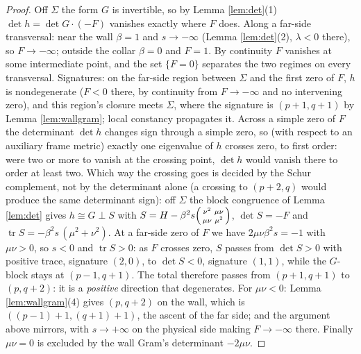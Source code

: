 \documentclass[11pt]{article}
\theoremstyle{definition}
\newcommand{\Sig}{\Sigma}
\begin{document}
\begin{proof}
Off $\Sig$ the form $G$ is invertible, so by Lemma \ref{lem:det}(1) $\det h = \det G \cdot (-F)$ vanishes exactly where $F$ does. Along a far-side transversal: near the wall $\beta = 1$ and $s \to -\infty$ (Lemma \ref{lem:det}(2), $\lambda < 0$ there), so $F \to -\infty$; outside the collar $\beta = 0$ and $F = 1$. By continuity $F$ vanishes at some intermediate point, and the set $\{F = 0\}$ separates the two regimes on every transversal. Signatures: on the far-side region between $\Sig$ and the first zero of $F$, $h$ is nondegenerate ($F < 0$ there, by continuity from $F \to -\infty$ and no intervening zero), and this region's closure meets $\Sig$, where the signature is $(p{+}1,q{+}1)$ by Lemma \ref{lem:wallgram}; local constancy propagates it. Across a simple zero of $F$ the determinant $\det h$ changes sign through a simple zero, so (with respect to an auxiliary frame metric) exactly one eigenvalue of $h$ crosses zero, to first order: were two or more to vanish at the crossing point, $\det h$ would vanish there to order at least two. Which way the crossing goes is decided by the Schur complement, not by the determinant alone (a crossing to $(p{+}2, q)$ would produce the same determinant sign): off $\Sig$ the block congruence of Lemma \ref{lem:det} gives $h \cong G \perp S$ with $S = H - \beta^2 s \begin{psmallmatrix} \nu^2 & \mu\nu \\ \mu\nu & \mu^2 \end{psmallmatrix}$, $\det S = -F$ and $\operatorname{tr} S = -\beta^2 s\,(\mu^2 + \nu^2)$. At a far-side zero of $F$ we have $2\mu\nu\beta^2 s = -1$ with $\mu\nu > 0$, so $s < 0$ and $\operatorname{tr} S > 0$: as $F$ crosses zero, $S$ passes from $\det S > 0$ with positive trace, signature $(2,0)$, to $\det S < 0$, signature $(1,1)$, while the $G$-block stays at $(p{-}1, q{+}1)$. The total therefore passes from $(p{+}1, q{+}1)$ to $(p, q{+}2)$: it is a \emph{positive} direction that degenerates. For $\mu\nu < 0$: Lemma \ref{lem:wallgram}(4) gives $(p, q{+}2)$ on the wall, which is $((p{-}1){+}1, (q{+}1){+}1)$, the ascent of the far side; and the argument above mirrors, with $s \to +\infty$ on the physical side making $F \to -\infty$ there. Finally $\mu\nu = 0$ is excluded by the wall Gram's determinant $-2\mu\nu$.
\end{proof}
\end{document}
